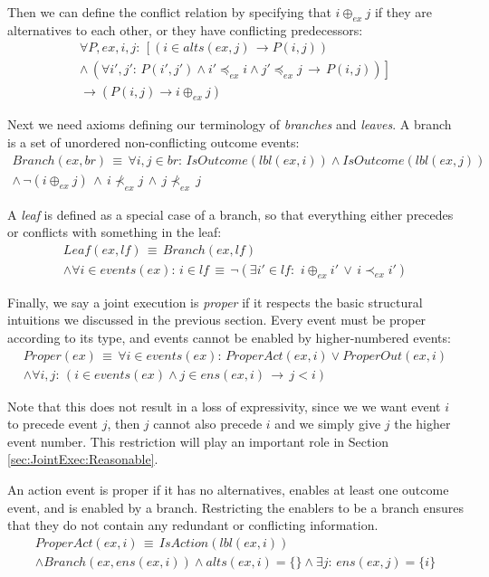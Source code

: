 Then we can define the conflict relation by specifying that $i\oplus_{ex}j$
if they are alternatives to each other, or they have conflicting predecessors:\begin{multline*}
\forall P,ex,i,j:\,\left[\left(i\in alts(ex,j)\,\rightarrow P(i,j)\right)\right.\\
\left.\wedge\,\left(\forall i',j':\, P(i',j')\wedge i'\preceq_{ex}i\wedge j'\preceq_{ex}j\,\rightarrow\, P(i,j)\right)\right]\\
\rightarrow\left(P(i,j)\rightarrow i\oplus_{ex}j\right)\end{multline*}


Next we need axioms defining our terminology of \emph{branches} and
\emph{leaves}. A branch is a set of unordered non-conflicting outcome
events:\begin{multline*}
Branch(ex,br)\,\equiv\,\forall i,j\in br:\, IsOutcome(lbl(ex,i))\wedge IsOutcome(lbl(ex,j))\\
\wedge\,\neg(i\oplus_{ex}j)\,\wedge\, i\not\prec_{ex}j\,\wedge\, j\not\prec_{ex}\, j\end{multline*}


A \emph{leaf} is defined as a special case of a branch, so that everything
either precedes or conflicts with something in the leaf:\begin{multline*}
Leaf(ex,lf)\,\equiv\, Branch(ex,lf)\\
\wedge\forall i\in events(ex):\, i\in lf\,\equiv\,\neg(\exists i'\in lf:\,\, i\oplus_{ex}i'\,\vee\, i\prec_{ex}i')\end{multline*}


Finally, we say a joint execution is \emph{proper} if it respects
the basic structural intuitions we discussed in the previous section.
Every event must be proper according to its type, and events cannot
be enabled by higher-numbered events:\begin{gather*}
Proper(ex)\,\equiv\,\forall i\in events(ex):\, ProperAct(ex,i)\vee ProperOut(ex,i)\\
\wedge\forall i,j:\,\left(i\in events(ex)\wedge j\in ens(ex,i)\,\rightarrow\, j<i\right)\end{gather*}


Note that this does not result in a loss of expressivity, since we
we want event $i$ to precede event $j$, then $j$ cannot also precede
$i$ and we simply give $j$ the higher event number. This restriction
will play an important role in Section \ref{sec:JointExec:Reasonable}.

An action event is proper if it has no alternatives, enables at least
one outcome event, and is enabled by a branch. Restricting the enablers
to be a branch ensures that they do not contain any redundant or conflicting
information.\begin{gather*}
ProperAct(ex,i)\,\equiv\, IsAction(lbl(ex,i))\\
\wedge Branch(ex,ens(ex,i))\wedge alts(ex,i)=\{\}\wedge\exists j:\, ens(ex,j)=\{i\}\end{gather*}


